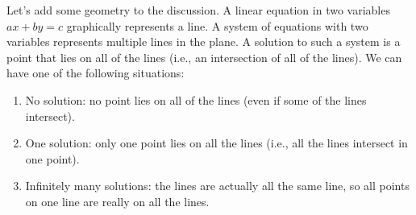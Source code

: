 Let's add some geometry to the discussion. 
A linear equation in two variables $ax+by=c$ graphically represents a line.  
A system of equations with two variables represents multiple lines in the plane. 
A solution to such a system is a point that lies on all of the lines
(i.e., an intersection of all of the lines).
We can have one of the following situations:
\begin{enumerate}
\item No solution: no point lies on all of the lines (even if some of
  the lines intersect).
\item One solution: only one point lies on all the lines (i.e., all
  the lines intersect in one point).
\item Infinitely many solutions: the lines are actually all the same
  line, so all points on one line are really on all the lines.
\end{enumerate}

